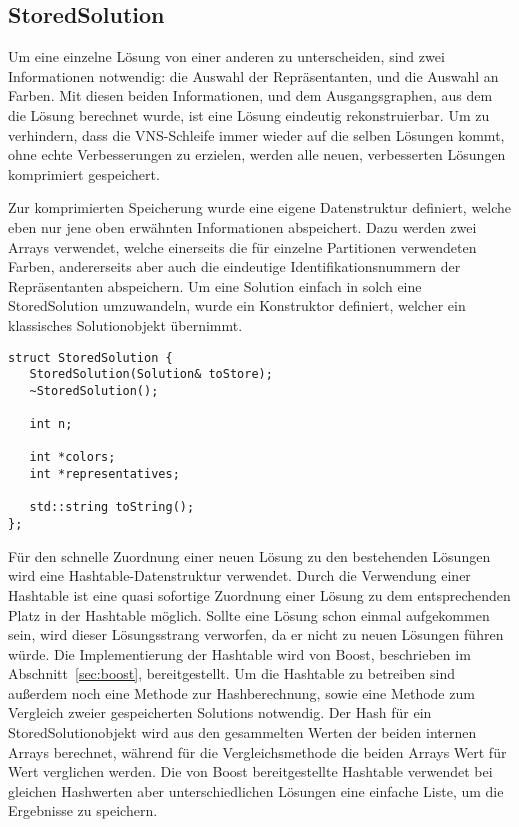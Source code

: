 \subsection{StoredSolution}
Um eine einzelne Lösung von einer anderen zu unterscheiden, sind zwei Informationen notwendig: die Auswahl der Repräsentanten, und die Auswahl 
an Farben. Mit diesen beiden Informationen, und dem Ausgangsgraphen, aus dem die Lösung berechnet wurde, ist eine Lösung eindeutig rekonstruierbar.
Um zu verhindern, dass die VNS-Schleife immer wieder auf die selben Lösungen kommt, ohne echte Verbesserungen zu erzielen, werden alle neuen, verbesserten
Lösungen komprimiert gespeichert. 

Zur komprimierten Speicherung wurde eine eigene Datenstruktur definiert, welche eben nur jene oben erwähnten Informationen abspeichert. 
Dazu werden zwei Arrays verwendet, welche einerseits die für einzelne Partitionen verwendeten Farben, andererseits aber auch die 
eindeutige Identifikationsnummern der Repräsentanten abspeichern. Um eine Solution einfach in solch eine StoredSolution umzuwandeln, wurde
ein Konstruktor definiert, welcher ein klassisches Solutionobjekt übernimmt. 

\singlespacing
\begin{lstlisting}[caption={Die Signatur von StoredSolution},label={lst:stored}]
struct StoredSolution {
   StoredSolution(Solution& toStore);
   ~StoredSolution();
   
   int n;
   
   int *colors;
   int *representatives;
   
   std::string toString();
};
\end{lstlisting}

Für den schnelle Zuordnung einer neuen Lösung zu den bestehenden Lösungen wird eine Hashtable-Datenstruktur verwendet. Durch die Verwendung einer
Hashtable ist eine quasi sofortige Zuordnung einer Lösung zu dem entsprechenden Platz in der Hashtable möglich. Sollte eine Lösung schon einmal 
aufgekommen sein, wird dieser Lösungsstrang verworfen, da er nicht zu neuen Lösungen führen würde. Die Implementierung der Hashtable wird von 
Boost, beschrieben im Abschnitt~\ref{sec:boost}, bereitgestellt. Um die Hashtable zu betreiben sind außerdem noch eine Methode zur Hashberechnung,
sowie eine Methode zum Vergleich zweier gespeicherten Solutions notwendig. Der Hash für ein StoredSolutionobjekt wird aus den gesammelten Werten
der beiden internen Arrays berechnet, während für die Vergleichsmethode die beiden Arrays Wert für Wert verglichen werden. Die von Boost 
bereitgestellte Hashtable verwendet bei gleichen Hashwerten aber unterschiedlichen Lösungen eine einfache Liste, um die Ergebnisse zu speichern.

